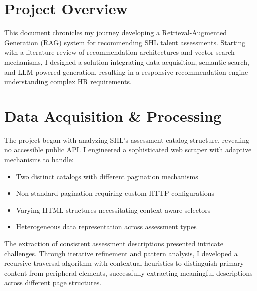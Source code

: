 \documentclass[9pt,a4paper,twocolumn]{article}
\begin{document}

\section*{\fontsize{9}{11}\selectfont Project Overview}
\fontsize{8}{10}\selectfont
This document chronicles my journey developing a Retrieval-Augmented Generation (RAG) system for recommending SHL talent assessments. Starting with a literature review of recommendation architectures and vector search mechanisms, I designed a solution integrating data acquisition, semantic search, and LLM-powered generation, resulting in a responsive recommendation engine understanding complex HR requirements.

\section{\fontsize{9}{11}\selectfont Data Acquisition \& Processing}
\fontsize{8}{10}\selectfont
The project began with analyzing SHL's assessment catalog structure, revealing no accessible public API. I engineered a sophisticated web scraper with adaptive mechanisms to handle:
\begin{itemize}
    \item Two distinct catalogs with different pagination mechanisms
    \item Non-standard pagination requiring custom HTTP configurations
    \item Varying HTML structures necessitating context-aware selectors
    \item Heterogeneous data representation across assessment types
\end{itemize}

The extraction of consistent assessment descriptions presented intricate challenges. Through iterative refinement and pattern analysis, I developed a recursive traversal algorithm with contextual heuristics to distinguish primary content from peripheral elements, successfully extracting meaningful descriptions across different page structures.
\end{document}
